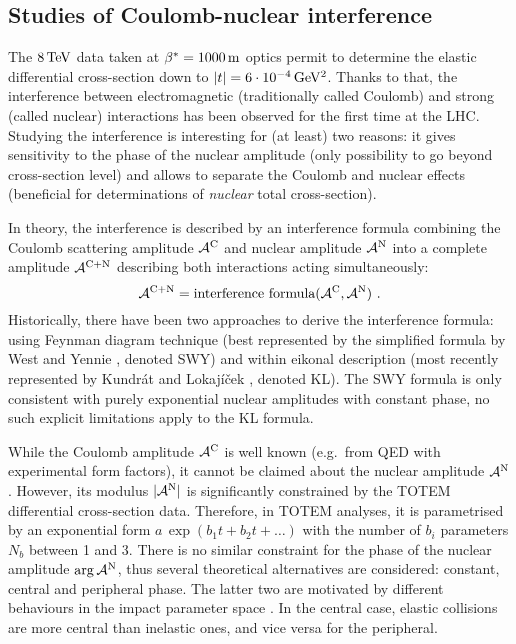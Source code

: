 \documentclass{desyproc}
\def\un#1{\,{\rm #1}}
\begin{document}
\subsection{Studies of Coulomb-nuclear interference}

The $8\un{TeV}$ data taken at $\beta^* = 1000\un{m}$ optics permit to determine the elastic differential cross-section down to $|t| = 6\cdot10^{-4}\un{GeV^2}$. Thanks to that, the interference between electromagnetic (traditionally called Coulomb) and strong (called nuclear) interactions has been observed for the first time at the LHC. Studying the interference is interesting for (at least) two reasons: it gives sensitivity to the phase of the nuclear amplitude (only possibility to go beyond cross-section level) and allows to separate the Coulomb and nuclear effects (beneficial for determinations of {\em nuclear} total cross-section).

In theory, the interference is described by an interference formula combining the Coulomb scattering amplitude ${\cal A}^{\rm C}$ and nuclear amplitude ${\cal A}^{\rm N}$ into a complete amplitude ${\cal A}^{\rm C+N}$ describing both interactions acting simultaneously:
\begin{equation}\label{eq:int f}
{\cal A}^{\rm C+N} = \hbox{interference formula}({\cal A}^{\rm C}, {\cal A}^{\rm N})\ .
\end{equation}
Historically, there have been two approaches to derive the interference formula: using Feynman diagram technique (best represented by the simplified formula by West and Yennie \cite{wy68}, denoted SWY) and within eikonal description (most recently represented by Kundr\' at and Lokaj\' i\v cek \cite{kl94}, denoted KL). The SWY formula is only consistent with purely exponential nuclear amplitudes with constant phase, no such explicit limitations apply to the KL formula.

While the Coulomb amplitude ${\cal A}^{\rm C}$ is well known (e.g.~from QED with experimental form factors), it cannot be claimed about the nuclear amplitude ${\cal A}^{\rm N}$. However, its modulus $|{\cal A}^{\rm N}|$ is significantly constrained by the TOTEM differential cross-section data. Therefore, in TOTEM analyses, it is parametrised by an exponential form $a\,\exp(b_1 t + b_2t + \ldots)$ with the number of $b_i$ parameters $N_b$ between 1 and 3. There is no similar constraint for the phase of the nuclear amplitude $\arg {\cal A}^{\rm N}$, thus several theoretical alternatives are considered: constant, central and peripheral phase. The latter two are motivated by different behaviours in the impact parameter space \cite{kl94}. In the central case, elastic collisions are more central than inelastic ones, and vice versa for the peripheral.
\end{document}
